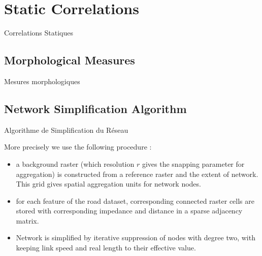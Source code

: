 




\newpage

\section{Static Correlations}{Correlations Statiques}

\label{app:sec:staticcorrelations}



\subsection{Morphological Measures}{Mesures morphologiques}



%



\subsection{Network Simplification Algorithm}{Algorithme de Simplification du Réseau}


 
 
More precisely we use the following procedure :
\begin{itemize}
\item a background raster (which resolution $r$ gives the snapping parameter for aggregation) is constructed from a reference raster and the extent of network. This grid gives spatial aggregation units for network nodes.
\item for each feature of the road dataset, corresponding connected raster cells are stored with corresponding impedance and distance in a sparse adjacency matrix.
\item Network is simplified by iterative suppression of nodes with degree two, with keeping link speed and real length to their effective value.
\end{itemize}

